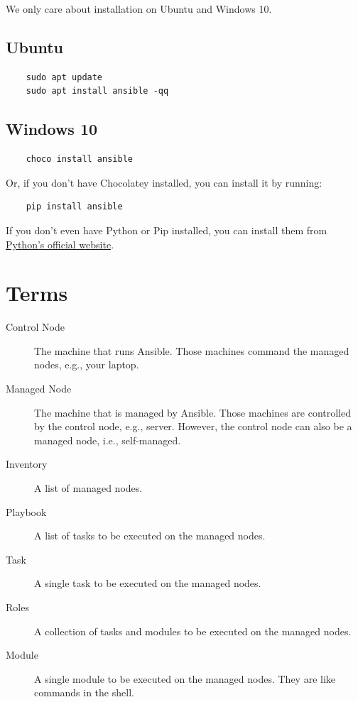 \documentclass{article}
\begin{document}
We only care about installation on Ubuntu and Windows 10.

\subsection{Ubuntu}

\begin{verbatim}
    sudo apt update
    sudo apt install ansible -qq
\end{verbatim}

\subsection{Windows 10}

\begin{verbatim}
    choco install ansible
\end{verbatim}

Or, if you don't have Chocolatey installed, you can install it by running:

\begin{verbatim}
    pip install ansible
\end{verbatim}

If you don't even have Python or Pip installed, you can install them from
\href{https://www.python.org/downloads/}{Python's official website}.

\section{Terms}

\begin{description}
    \item[Control Node] The machine that runs Ansible. Those machines command the
        managed nodes, e.g., your laptop.
    \item[Managed Node] The machine that is managed by Ansible. Those machines are
        controlled by the control node, e.g., server. However, the control node can
        also be a managed node, i.e., self-managed.
    \item[Inventory] A list of managed nodes.
    \item[Playbook] A list of tasks to be executed on the managed nodes.
    \item[Task] A single task to be executed on the managed nodes.
    \item[Roles] A collection of tasks and modules to be executed on the managed
        nodes.
    \item[Module] A single module to be executed on the managed nodes. They are
        like commands in the shell.
\end{description}
\end{document}
